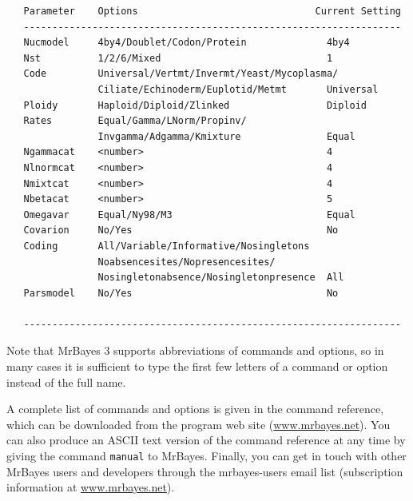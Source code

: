 \documentclass[12pt]{book}
\begin{document}
\begin{singlespacing}
\small
\begin{verbatim}
   Parameter    Options                               Current Setting
   ------------------------------------------------------------------
   Nucmodel     4by4/Doublet/Codon/Protein              4by4
   Nst          1/2/6/Mixed                             1
   Code         Universal/Vertmt/Invermt/Yeast/Mycoplasma/
                Ciliate/Echinoderm/Euplotid/Metmt       Universal
   Ploidy       Haploid/Diploid/Zlinked                 Diploid
   Rates        Equal/Gamma/LNorm/Propinv/
                Invgamma/Adgamma/Kmixture               Equal
   Ngammacat    <number>                                4
   Nlnormcat    <number>                                4
   Nmixtcat     <number>                                4
   Nbetacat     <number>                                5
   Omegavar     Equal/Ny98/M3                           Equal
   Covarion     No/Yes                                  No
   Coding       All/Variable/Informative/Nosingletons
                Noabsencesites/Nopresencesites/
                Nosingletonabsence/Nosingletonpresence  All
   Parsmodel    No/Yes                                  No

   ------------------------------------------------------------------
\end{verbatim}
\normalsize
\end{singlespacing}

Note that MrBayes 3 supports abbreviations of commands and options, so in many cases it
is sufficient to type the first few letters of a command or option instead of the full name.

A complete list of commands and options is given in the command reference, which can
be downloaded from the program web site (\url{www.mrbayes.net}). You can also produce an
ASCII text version of the command reference at any time by giving the command
\texttt{manual} to MrBayes. Finally, you can get in
touch with other MrBayes users and developers through the mrbayes-users email list
(subscription information at \url{www.mrbayes.net}).
\end{document}
